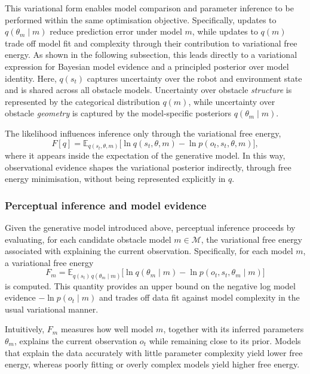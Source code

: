 \documentclass[a4paper, twoside]{article}
\begin{document}
This variational form enables model comparison and parameter inference to be performed
within the same optimisation objective.
Specifically, updates to $q(\theta_m \mid m)$ reduce prediction error under model $m$,
while updates to $q(m)$ trade off model fit and complexity through their contribution
to variational free energy.
As shown in the following subsection, this leads directly to a variational expression
for Bayesian model evidence and a principled posterior over model identity.
Here, $q(s_t)$ captures uncertainty over the robot and environment state and is shared
across all obstacle models.
Uncertainty over obstacle \emph{structure} is represented by the categorical distribution
$q(m)$, while uncertainty over obstacle \emph{geometry} is captured by the
model-specific posteriors $q(\theta_m \mid m)$.

The likelihood influences inference only through the variational free energy,
\begin{equation}
F[q]
=
\mathbb{E}_{q(s_t,\theta,m)}
\big[
\ln q(s_t,\theta,m)
-
\ln p(o_t,s_t,\theta,m)
\big],
\end{equation}
where it appears inside the expectation of the generative model.
In this way, observational evidence shapes the variational posterior indirectly, through
free energy minimisation, without being represented explicitly in $q$.



\subsubsection{Perceptual inference and model evidence}
\label{sec:perceptual_inference_model_evidence}

Given the generative model introduced above, perceptual inference proceeds by evaluating,
for each candidate obstacle model $m \in \mathcal{M}$, the variational free energy associated
with explaining the current observation.
Specifically, for each model $m$, a variational free energy
\begin{equation}
\label{eq:F_m}
F_m
=
\mathbb{E}_{q(s_t)\,q(\theta_m \mid m)}
\big[
\ln q(\theta_m \mid m)
-
\ln p(o_t, s_t, \theta_m \mid m)
\big]
\end{equation}
is computed.
This quantity provides an upper bound on the negative log model evidence $-\ln p(o_t \mid m)$
and trades off data fit against model complexity in the usual variational manner.

Intuitively, $F_m$ measures how well model $m$, together with its inferred parameters
$\theta_m$, explains the current observation $o_t$ while remaining close to its prior.
Models that explain the data accurately with little parameter complexity yield lower
free energy, whereas poorly fitting or overly complex models yield higher free energy.
\end{document}
